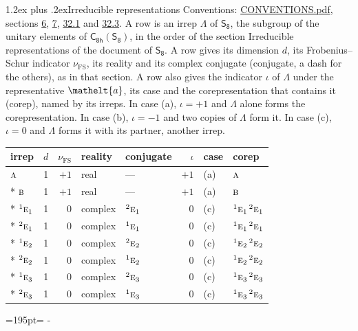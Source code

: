 \documentclass[10pt,a4paper]{article}
\makeatletter
\renewcommand\section{\@startsection{section}{1}{\z@}{-3ex plus -1ex minus -.2ex}%
  {1.2ex plus .2ex}{\normalfont\large\sffamily\bfseries\color{parttitle}}}
\newcommand{\needspace}[1]{\par\penalty-100\begingroup\dimen0=#1\relax\dimen2=\pagegoal
  \advance\dimen2-\pagetotal\ifdim\dimen0>\dimen2\relax\ifdim\dimen2>0pt\vfil\break\fi\fi
  \endgroup}
\numberwithin{equation}{section}
\newcommand{\eltfont}[1]{{\let\sigma\eltsigma\mathelt{#1}}}
\newcommand{\grp}[1]{\mathsf{#1}}
\newcommand{\irr}[1]{\text{\normalfont\scshape #1}}
\newcommand{\conjpair}[1]{{}^{#1}}
\newcommand{\elt}[1]{\eltfont{#1}}
\newcommand{\fsind}{\nu_{\mathrm{FS}}}
\makeatother
\begin{document}
\section{Irreducible representations}\label{s:irreps}
Conventions: \href{../../CONVENTIONS.pdf}{CONVENTIONS.pdf}, sections \href{../../../rotation/CONVENTIONS.pdf\#conv.6}{6}, \href{../../../rotation/CONVENTIONS.pdf\#conv.7}{7}, \href{../../CONVENTIONS.pdf\#conv.32.1}{32.1} and \href{../../CONVENTIONS.pdf\#conv.32.3}{32.3}.
\leavevmode\label{n:irrep.Delta}A row is an irrep $\Lambda$ of $\grp{S_{8}}$, the subgroup of the unitary elements of $\grp{C_{8h}}(\grp{S_{8}})$, in the order of the section Irreducible representations of the document of \href{../../../rotation/data/pdf/S8.pdf}{$\grp{S_{8}}$}. \label{n:index.dimension}\label{n:index.frobenius}\label{n:head.irrep}\label{n:head.reality}\label{n:head.conjugate}A row gives its dimension $d$, its Frobenius--Schur indicator $\fsind$, its reality and its complex conjugate (conjugate, a dash for the others), as in that section. \label{n:head.case.corep}\label{n:head.corep}A row also gives the indicator $\iota$ of $\Lambda$ under the representative $\elt{a}$, its case and the corepresentation that contains it (corep), named by its irreps. In case (a), $\iota = +1$ and $\Lambda$ alone forms the corepresentation. In case (b), $\iota = -1$ and two copies of $\Lambda$ form it. In case (c), $\iota = 0$ and $\Lambda$ forms it with its partner, another irrep.
\setlength{\emergencystretch}{2em}\par\setlength{\emergencystretch}{0pt}
{\small\renewcommand{\arraystretch}{1.25}\setlength{\tabcolsep}{4pt}\begin{longtable}{@{}lrrllrll@{}}\toprule
irrep & $d$ & $\fsind$ & reality & conjugate & $\iota$ & case & corep\\\midrule\endhead
\bottomrule\endfoot\endlastfoot
$\irr{a}$ & 1 & $+1$ & real & --- & $+1$ & (a) & $\irr{a}$\\*
$\irr{b}$ & 1 & $+1$ & real & --- & $+1$ & (a) & $\irr{b}$\\*
$\conjpair{1}\irr{e}_{1}$ & 1 & $0$ & complex & $\conjpair{2}\irr{e}_{1}$ & $0$ & (c) & $\conjpair{1}\irr{e}_{1}\,\conjpair{2}\irr{e}_{1}$\\*
$\conjpair{2}\irr{e}_{1}$ & 1 & $0$ & complex & $\conjpair{1}\irr{e}_{1}$ & $0$ & (c) & $\conjpair{1}\irr{e}_{1}\,\conjpair{2}\irr{e}_{1}$\\*
$\conjpair{1}\irr{e}_{2}$ & 1 & $0$ & complex & $\conjpair{2}\irr{e}_{2}$ & $0$ & (c) & $\conjpair{1}\irr{e}_{2}\,\conjpair{2}\irr{e}_{2}$\\*
$\conjpair{2}\irr{e}_{2}$ & 1 & $0$ & complex & $\conjpair{1}\irr{e}_{2}$ & $0$ & (c) & $\conjpair{1}\irr{e}_{2}\,\conjpair{2}\irr{e}_{2}$\\*
$\conjpair{1}\irr{e}_{3}$ & 1 & $0$ & complex & $\conjpair{2}\irr{e}_{3}$ & $0$ & (c) & $\conjpair{1}\irr{e}_{3}\,\conjpair{2}\irr{e}_{3}$\\*
$\conjpair{2}\irr{e}_{3}$ & 1 & $0$ & complex & $\conjpair{1}\irr{e}_{3}$ & $0$ & (c) & $\conjpair{1}\irr{e}_{3}\,\conjpair{2}\irr{e}_{3}$\\
\bottomrule\end{longtable}}
\needspace{195pt}
\end{document}
